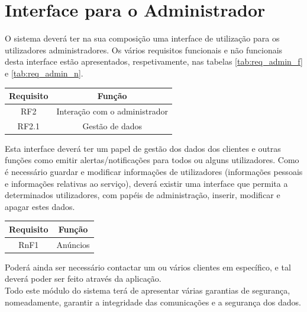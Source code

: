 \section{Interface para o Administrador} \label{sec:req_admin}
O sistema deverá ter na sua composição uma interface de utilização para os utilizadores administradores. Os vários requisitos funcionais e não funcionais desta interface estão apresentados, respetivamente, nas tabelas \ref{tab:req_admin_f} e \ref{tab:req_admin_n}.

\begin{center}
\begin{tabular}[c]{c c} 
\hline
Requisito & Função\\
\hline
RF2 & Interação com o administrador\\ 

RF2.1 & Gestão de dados\\

\hline
\end{tabular}
\label{tab:req_admin_f}
\end{center}
\vspace{8mm} %

Esta interface deverá ter um papel de gestão dos dados dos clientes e outras funções como emitir alertas/notificações para todos ou alguns utilizadores. Como é necessário guardar e modificar informações de utilizadores (informações pessoais e informações relativas ao serviço), deverá existir uma interface que permita a determinados utilizadores, com papéis de administração, inserir, modificar e apagar estes dados.

\begin{center}
\begin{tabular}[c]{c c} 
\hline
Requisito & Função\\
\hline
RnF1 & Anúncios\\
\hline
\end{tabular}
\label{tab:req_admin_n}
\end{center}

Poderá ainda ser necessário contactar um ou vários clientes em específico, e tal deverá poder ser feito através da aplicação.\\
Todo este módulo do sistema terá de apresentar várias garantias de segurança, nomeadamente, garantir a integridade das comunicações e a segurança dos dados.

